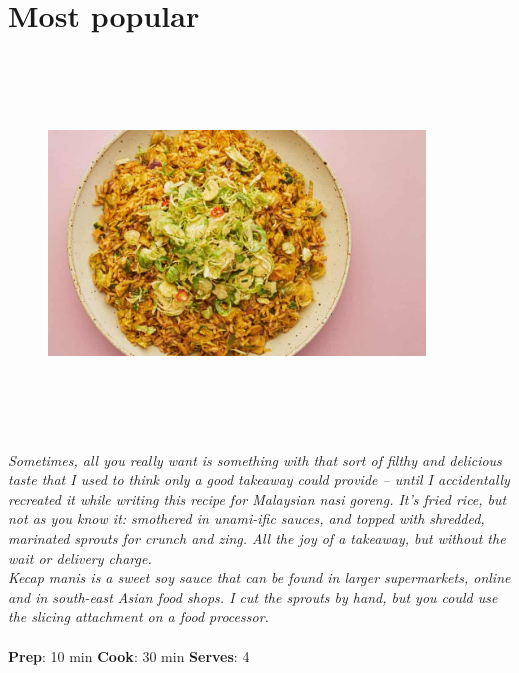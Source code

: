 \documentclass{book}
\begin{document}
\section{Most popular}
\begin{figure}
\centering\includegraphics[width=10cm,height=10cm,keepaspectratio]{Recipe_Pictures/Most_popular.png}
\end{figure}
\emph{Sometimes, all you really want is something with that sort of filthy and delicious taste that I used to think only a good takeaway could provide – until I accidentally recreated it while writing this recipe for Malaysian nasi goreng. It’s fried rice, but not as you know it: smothered in unami-ific sauces, and topped with shredded, marinated sprouts for crunch and zing. All the joy of a takeaway, but without the wait or delivery charge.\\ 
Kecap manis is a sweet soy sauce that can be found in larger supermarkets, online and in south-east Asian food shops. I cut the sprouts by hand, but you could use the slicing attachment on a food processor.}\\\\ 
\textbf{Prep}: 10 min
\textbf{Cook}: 30 min
\textbf{Serves}: 4
\end{document}
